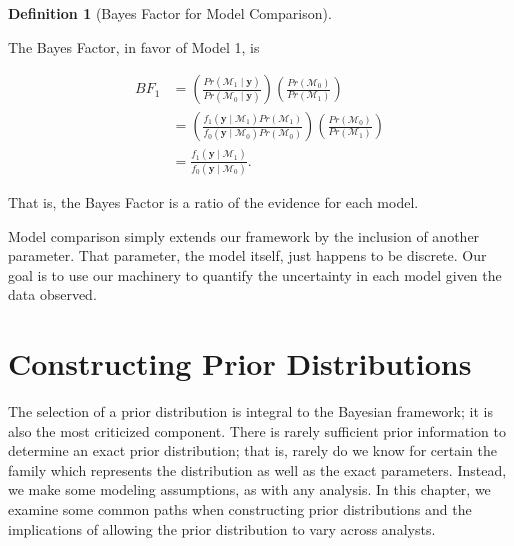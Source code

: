 \documentclass[
  letterpaper,
  DIV=11,
  numbers=noendperiod]{scrreprt}
\theoremstyle{definition}
\theoremstyle{definition}
\newtheorem{definition}{Definition}[chapter]
\theoremstyle{plain}
\theoremstyle{remark}
\begin{document}
\begin{definition}[Bayes Factor for Model
Comparison]\protect\hypertarget{def-bayes-factor-models}{}\label{def-bayes-factor-models}

The Bayes Factor, in favor of Model 1, is

\[
\begin{aligned}
  BF_{1} &= \left(\frac{Pr(\mathcal{M}_1 \mid \mathbf{y})}{Pr(\mathcal{M}_0 \mid \mathbf{y})}\right)\left(\frac{Pr(\mathcal{M}_0)}{Pr(\mathcal{M}_1)}\right) \\
    &= \left(\frac{f_1(\mathbf{y} \mid \mathcal{M}_1) Pr(\mathcal{M}_1)}{f_0(\mathbf{y} \mid \mathcal{M}_0) Pr(\mathcal{M}_0)}\right)\left(\frac{Pr(\mathcal{M}_0)}{Pr(\mathcal{M}_1)}\right) \\
    &= \frac{f_1(\mathbf{y} \mid \mathcal{M}_1)}{f_0(\mathbf{y} \mid \mathcal{M}_0)}.
\end{aligned}
\]

That is, the Bayes Factor is a ratio of the evidence for each model.

\end{definition}

Model comparison simply extends our framework by the inclusion of
another parameter. That parameter, the model itself, just happens to be
discrete. Our goal is to use our machinery to quantify the uncertainty
in each model given the data observed.

\hypertarget{sec-constructing-priors}{%
\chapter{Constructing Prior
Distributions}\label{sec-constructing-priors}}

\providecommand{\norm}[1]{\lVert#1\rVert}
\providecommand{\abs}[1]{\lvert#1\rvert}
\providecommand{\iid}{\stackrel{\text{IID}}{\sim}}
\providecommand{\ind}{\stackrel{\text{Ind}}{\sim}}

\providecommand{\bm}[1]{\mathbf{#1}}
\providecommand{\bs}[1]{\boldsymbol{#1}}
\providecommand{\bbeta}{\bs{\beta}}

\providecommand{\Ell}{\mathcal{L}}
\providecommand{\indep}{\perp\negthickspace\negmedspace\perp}

The selection of a prior distribution is integral to the Bayesian
framework; it is also the most criticized component. There is rarely
sufficient prior information to determine an exact prior distribution;
that is, rarely do we know for certain the family which represents the
distribution as well as the exact parameters. Instead, we make some
modeling assumptions, as with any analysis. In this chapter, we examine
some common paths when constructing prior distributions and the
implications of allowing the prior distribution to vary across analysts.
\end{document}

